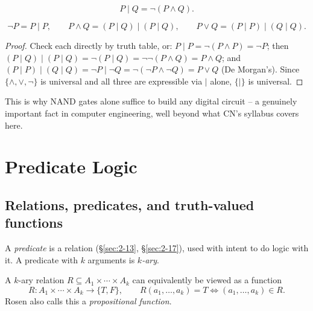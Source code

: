 \documentclass[11pt]{article}
\begin{document}
\bigskip
\begin{definition}
\[
P \mid Q = \neg(P\wedge Q).
\]
\end{definition}

\begin{theorem}
\[
\neg P = P\mid P, \qquad P\wedge Q = (P\mid Q)\mid(P\mid Q), \qquad P\vee Q = (P\mid P)\mid(Q\mid Q).
\]
\end{theorem}
\begin{proof}
Check each directly by truth table, or: $P\mid P = \neg(P\wedge P) = \neg P$; then $(P\mid Q)\mid(P\mid Q) = \neg(P\mid Q) = \neg\neg(P\wedge Q) = P\wedge Q$; and $(P\mid P)\mid(Q\mid Q) = \neg P \mid \neg Q = \neg(\neg P\wedge\neg Q) = P\vee Q$ (De Morgan's). Since $\{\wedge,\vee,\neg\}$ is universal and all three are expressible via $\mid$ alone, $\{\mid\}$ is universal.
\end{proof}

\begin{note}
This is why NAND gates alone suffice to build any digital circuit -- a genuinely important fact in computer engineering, well beyond what CN's syllabus covers here.
\end{note}

\newpage
\section{Predicate Logic}

\subsection{Relations, predicates, and truth-valued functions}
\label{sec:5-1}

\begin{definition}[Predicate]
A \emph{predicate} is a relation (\S\ref{sec:2-13}, \S\ref{sec:2-17}), used with intent to do logic with it. A predicate with $k$ arguments is \emph{$k$-ary}.
\end{definition}

\begin{definition}
A $k$-ary relation $R \subseteq A_1\times\cdots\times A_k$ can equivalently be viewed as a function
\[
R : A_1\times\cdots\times A_k \to \{T,F\}, \qquad R(a_1,\dots,a_k) = T \iff (a_1,\dots,a_k)\in R.
\]
Rosen also calls this a \emph{propositional function}.
\end{definition}
\end{document}
